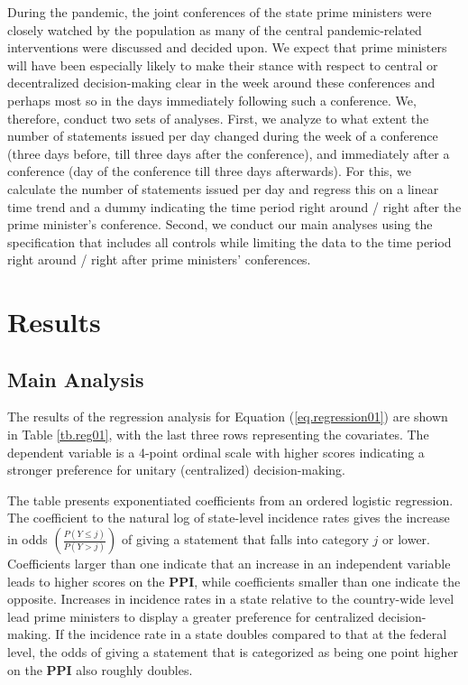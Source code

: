 \documentclass[12pt, abstracton]{scrartcl}
\begin{document}
During the pandemic, the joint conferences of the state prime ministers were closely watched by the population as many of the central pandemic-related interventions were discussed and decided upon. We expect that prime ministers will have been especially likely to make their stance with respect to central or decentralized decision-making clear in the week around these conferences and perhaps most so in the days immediately following such a conference. We, therefore, conduct two sets of analyses. First, we analyze to what extent the number of statements issued per day changed during the week of a conference (three days before, till three days after the conference), and immediately after a conference (day of the conference till three days afterwards). For this, we calculate the number of statements issued per day and regress this on a linear time trend and a dummy indicating the time period right around / right after the prime minister's conference. Second, we conduct our main analyses using the specification that includes all controls while limiting the data to the time period right around / right after prime ministers' conferences.

\section{Results}\label{sec.results}
\subsection{Main Analysis}
The results of the regression analysis for Equation (\ref{eq.regression01}) are shown in Table \ref{tb.reg01}, with the last three rows representing the covariates. The dependent variable is a 4-point ordinal scale with higher scores indicating a stronger preference for unitary (centralized) decision-making.



The table presents exponentiated coefficients from an ordered logistic regression. The coefficient to the natural log of state-level incidence rates gives the increase in odds $\left( \frac{P(Y \leq j)}{P(Y > j)} \right)$ of giving a statement that falls into category $j$ or lower. Coefficients larger than one indicate that an increase in an independent variable leads to higher scores on the \textbf{PPI}, while coefficients smaller than one indicate the opposite. Increases in incidence rates in a state relative to the country-wide level lead prime ministers to display a greater preference for centralized decision-making. If the incidence rate in a state doubles compared to that at the federal level, the odds of giving a statement that is categorized as being one point higher on the \textbf{PPI} also roughly doubles.
\end{document}
